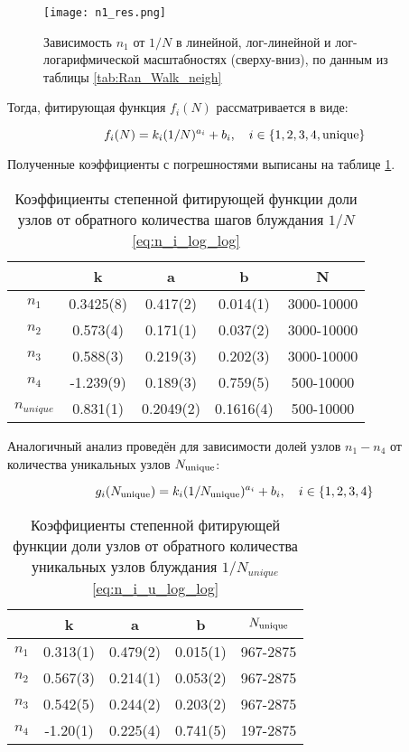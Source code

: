 \begin{figure}
\centering
\texttt{[image: n1\_res.png]}
\caption{Зависимость $n_1$ от $1/N$  в линейной, лог-линейной и лог-логарифмической масштабностях (сверху-вниз), по данным из таблицы \ref{tab:Ran_Walk_neigh}} 
\label{fig:n1_scale}
\end{figure}

Тогда, фитирующая функция $f_i(N)$ рассматривается в виде:

\begin{equation}
f_i(N) = k_i (1/N)^{a_i} + b_i,\ \ \ i \in \{1,2,3,4, \textup{unique}\}
\label{eq:n_i_log_log}
\end{equation}

Полученные коэффициенты с погрешностями выписаны на таблице \ref{tab:n_i_log_log}.

\begin{table}[h]
\centering
\begin{tabular}{|c|c|c|c|c|}
\hline
 & k & a & b & N \\ \hline
$n_1$ & 0.3425(8) & 0.417(2) & 0.014(1) & 3000-10000 \\ \hline
$n_2$ & 0.573(4) & 0.171(1) & 0.037(2) & 3000-10000 \\ \hline
$n_3$ & 0.588(3) & 0.219(3) & 0.202(3) & 3000-10000 \\ \hline
$n_4$ & -1.239(9) & 0.189(3) & 0.759(5) & 500-10000 \\ \hline
$n_{unique}$ & 0.831(1) & 0.2049(2) & 0.1616(4) & 500-10000 \\ \hline
\end{tabular}
\caption{Коэффициенты степенной фитирующей функции доли узлов от обратного количества шагов блуждания $1/N$ \eqref{eq:n_i_log_log}}
\label{tab:n_i_log_log}
\end{table}
Аналогичный анализ проведён для зависимости долей узлов $n_1 - n_4$ от количества уникальных узлов $N_{\textup{unique}}$:

\begin{equation}
g_i (\Nun) = k_i  (1/\Nun)^{a_i} + b_i,\ \ \ i \in \{1,2,3,4\}
\label{eq:n_i_u_log_log}
\end{equation}

\begin{table}[h]
\centering
\begin{tabular}{|c|c|c|c|c|}
\hline
 & k & a & b & $N_{\textup{unique}}$ \\ \hline
$n_1$ & 0.313(1) & 0.479(2) & 0.015(1) & 967-2875 \\ \hline
$n_2$ & 0.567(3) & 0.214(1) & 0.053(2) & 967-2875 \\ \hline
$n_3$  & 0.542(5) & 0.244(2) & 0.203(2) & 967-2875 \\ \hline
$n_4$ & -1.20(1) & 0.225(4) & 0.741(5) & 197-2875 \\ \hline
\end{tabular} 
\caption{Коэффициенты степенной фитирующей функции доли узлов от обратного количества уникальных узлов блуждания $1/N_{unique}$ \eqref{eq:n_i_u_log_log}}
\label{tab:n_i_u_log_log}
\end{table}

